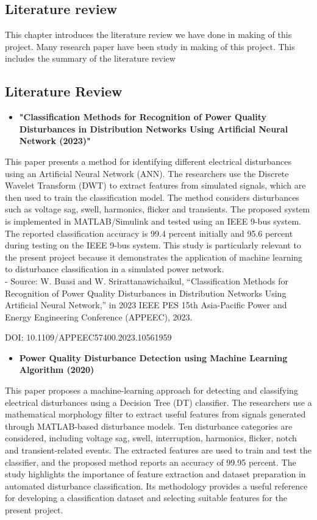 \documentclass[12pt]{article}
\begin{document}
\begin{center}
\section{Literature review}
This chapter introduces the literature review we have done in making of this project. Many research paper have been study in making of this project. This includes the summary of the literature review 
\subsection{Literature Review}

\begin{itemize}
    \item \textbf{"Classification Methods for Recognition of Power Quality Disturbances in Distribution Networks Using Artificial Neural Network (2023)"}
\end{itemize}
\raggedright
\justifying
This paper presents a method for identifying different electrical disturbances using an Artificial Neural Network (ANN). The researchers use the Discrete Wavelet Transform (DWT) to extract features from simulated signals, which are then used to train the classification model. The method considers disturbances such as voltage sag, swell, harmonics, flicker and transients. The proposed system is implemented in MATLAB/Simulink and tested using an IEEE 9-bus system. The reported classification accuracy is 99.4 percent initially and 95.6 percent during testing on the IEEE 9-bus system. This study is particularly relevant to the present project because it demonstrates the application of machine learning to disturbance classification in a simulated power network.\\

 - Source: W. Buasi and W. Srirattanawichaikul, “Classification Methods for Recognition of Power Quality Disturbances in Distribution Networks Using Artificial Neural Network,” in 2023 IEEE PES 15th Asia-Pacific Power and Energy Engineering Conference (APPEEC), 2023.

DOI: 10.1109/APPEEC57400.2023.10561959
\begin{itemize}
    \item \textbf{Power Quality Disturbance Detection using Machine Learning Algorithm (2020)}
\end{itemize}
   This paper proposes a machine-learning approach for detecting and classifying electrical disturbances using a Decision Tree (DT) classifier. The researchers use a mathematical morphology filter to extract useful features from signals generated through MATLAB-based disturbance models. Ten disturbance categories are considered, including voltage sag, swell, interruption, harmonics, flicker, notch and transient-related events. The extracted features are used to train and test the classifier, and the proposed method reports an accuracy of 99.95 percent. The study highlights the importance of feature extraction and dataset preparation in automated disturbance classification. Its methodology provides a useful reference for developing a classification dataset and selecting suitable features for the present project.\\


\end{center}
\end{document}

